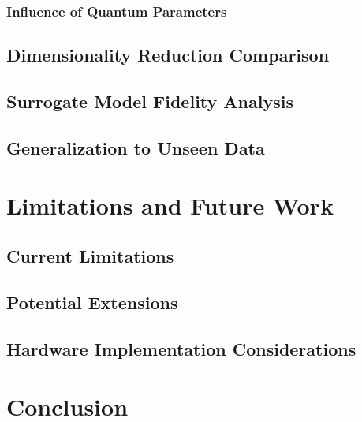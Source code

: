 \documentclass[conference]{IEEEtran}
\begin{document}
\subsubsection{Influence of Quantum Parameters}
\subsection{Dimensionality Reduction Comparison}
\subsection{Surrogate Model Fidelity Analysis}
\subsection{Generalization to Unseen Data}


\section{Limitations and Future Work}
\subsection{Current Limitations}
\subsection{Potential Extensions}
\subsection{Hardware Implementation Considerations}

\section{Conclusion}



\end{document}
